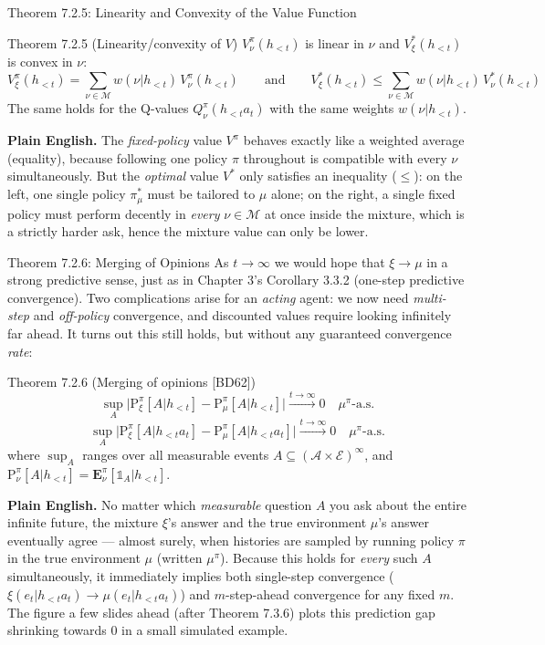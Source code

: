 \documentclass[aspectratio=169,10pt]{beamer}
\newcommand{\Mcal}{\mathcal{M}}
\newcommand{\Acal}{\mathcal{A}}
\newcommand{\Ecal}{\mathcal{E}}
\begin{document}
\begin{frame}{Theorem 7.2.5: Linearity and Convexity of the Value Function}
  \begin{block}{Theorem 7.2.5 (Linearity/convexity of $V$)}
    $V_\nu^\pi(h_{<t})$ is linear in $\nu$ and $V_\xi^*(h_{<t})$ is convex
    in $\nu$:
    \[
      V_\xi^\pi(h_{<t}) = \sum_{\nu\in\Mcal} w(\nu|h_{<t})\,V_\nu^\pi(h_{<t})
      \qquad\text{and}\qquad
      V_\xi^*(h_{<t}) \le \sum_{\nu\in\Mcal} w(\nu|h_{<t})\,V_\nu^*(h_{<t})
    \]
    The same holds for the Q-values $Q_\nu^\pi(h_{<t}a_t)$ with the same
    weights $w(\nu|h_{<t})$.
  \end{block}
  \textbf{Plain English.} The \emph{fixed-policy} value $V^\pi$ behaves
  exactly like a weighted average (equality), because following one policy
  $\pi$ throughout is compatible with every $\nu$ simultaneously. But the
  \emph{optimal} value $V^*$ only satisfies an inequality ($\le$): on the
  left, one single policy $\pi_\mu^*$ must be tailored to $\mu$ alone; on
  the right, a single fixed policy must perform decently in \emph{every}
  $\nu\in\Mcal$ at once inside the mixture, which is a strictly harder ask,
  hence the mixture value can only be lower.
\end{frame}

\begin{frame}{Theorem 7.2.6: Merging of Opinions}
  As $t\to\infty$ we would hope that $\xi\to\mu$ in a strong predictive
  sense, just as in Chapter 3's Corollary 3.3.2 (one-step predictive
  convergence). Two complications arise for an \emph{acting} agent: we now
  need \emph{multi-step} and \emph{off-policy} convergence, and discounted
  values require looking infinitely far ahead. It turns out this still
  holds, but without any guaranteed convergence \emph{rate}:
  \begin{block}{Theorem 7.2.6 (Merging of opinions [BD62])}
    \[
      \sup_A\big|\mathrm{P}_\xi^\pi[A|h_{<t}] - \mathrm{P}_\mu^\pi[A|h_{<t}]\big|
      \xrightarrow{t\to\infty} 0 \quad \mu^\pi\text{-a.s.}
    \]
    \[
      \sup_A\big|\mathrm{P}_\xi^\pi[A|h_{<t}a_t] - \mathrm{P}_\mu^\pi[A|h_{<t}a_t]\big|
      \xrightarrow{t\to\infty} 0 \quad \mu^\pi\text{-a.s.}
    \]
    where $\sup_A$ ranges over all measurable events
    $A\subseteq(\Acal\times\Ecal)^\infty$, and
    $\mathrm{P}_\nu^\pi[A|h_{<t}] = \mathbf{E}_\nu^\pi[\mathbb{1}_A|h_{<t}]$.
  \end{block}
  \textbf{Plain English.} No matter which \emph{measurable} question $A$ you
  ask about the entire infinite future, the mixture $\xi$'s answer and the
  true environment $\mu$'s answer eventually agree --- almost surely, when
  histories are sampled by running policy $\pi$ in the true environment
  $\mu$ (written $\mu^\pi$). Because this holds for \emph{every} such $A$
  simultaneously, it immediately implies both single-step convergence
  ($\xi(e_t|h_{<t}a_t)\to\mu(e_t|h_{<t}a_t)$) and $m$-step-ahead
  convergence for any fixed $m$. The figure a few slides ahead (after
  Theorem 7.3.6) plots this prediction gap shrinking towards $0$ in a small
  simulated example.
\end{frame}
\end{document}
